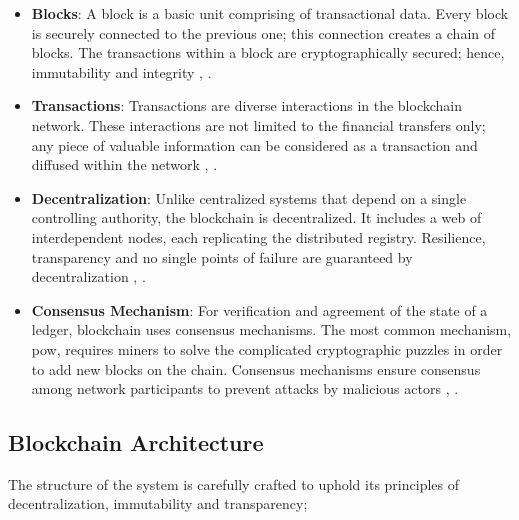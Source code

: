 \begin{itemize}
  \item \textbf{Blocks}: A block is a basic unit comprising of transactional data. Every block is securely connected to the previous one; this connection creates a chain 
  of blocks. The transactions within a block are cryptographically secured; hence, immutability and integrity \cite{9596538}, \cite{ibm_blockchain}.
  \item \textbf{Transactions}: Transactions are diverse interactions in the blockchain network. These interactions are not limited to the financial transfers only; any 
  piece of valuable information can be considered as a transaction and diffused within the network \cite{9752154}, \cite{9036241}.
  \item \textbf{Decentralization}: Unlike centralized systems that depend on a single controlling authority, the blockchain is decentralized. It includes a web of 
  interdependent nodes, each replicating the distributed registry. Resilience, transparency and no single points of failure are guaranteed by decentralization \cite{9596538}, \cite{9752154}.
  \item \textbf{Consensus Mechanism}:  For verification and agreement of the state of a ledger, blockchain uses consensus mechanisms. The most common mechanism, \gls{pow}, 
  requires miners to solve the complicated cryptographic puzzles in order to add new blocks on the chain. Consensus mechanisms ensure consensus among network participants 
  to prevent attacks by malicious actors \cite{9596538}, \cite{9752154}.
\end{itemize}

\subsection{Blockchain Architecture}

The structure of the system is carefully crafted to uphold its principles of decentralization, immutability and transparency;

